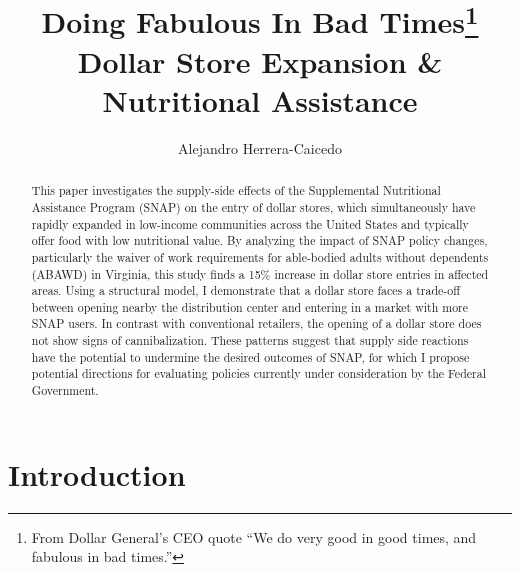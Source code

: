 \documentclass[11.5pt]{article}
\title{Doing Fabulous In Bad Times\footnote{From Dollar General's CEO quote ``We do very good in good times, and fabulous in bad times.''} \\ Dollar Store Expansion \& Nutritional Assistance}
\author{Alejandro Herrera-Caicedo }
\date{}
\begin{document}
\maketitle
\begin{abstract}
    This paper investigates the supply-side effects of the Supplemental Nutritional Assistance Program (SNAP) on the entry of dollar stores, which simultaneously have rapidly expanded in low-income communities across the United States and typically offer food with low nutritional value. By analyzing the impact of SNAP policy changes, particularly the waiver of work requirements for able-bodied adults without dependents (ABAWD) in Virginia, this study finds a 15\% increase in dollar store entries in affected areas. Using a structural model, I demonstrate that a dollar store faces a trade-off between opening nearby the distribution center and entering in a market with more SNAP users. In contrast with conventional retailers, the opening of a dollar store does not show signs of cannibalization. These patterns suggest that supply side reactions have the potential to undermine the desired outcomes of SNAP, for which I propose potential directions for evaluating policies currently under consideration by the Federal Government.
    
    
    
    
\end{abstract}


\section{Introduction}
\end{document}

